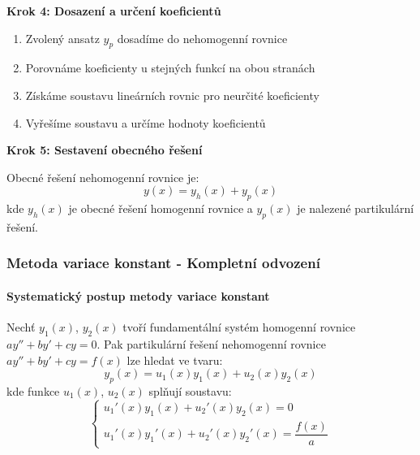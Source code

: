 \vspace{1\baselineskip}

\noindent\textbf{Krok 4: Dosazení a určení koeficientů}

\begin{enumerate}
\item Zvolený ansatz $y_p$ dosadíme do nehomogenní rovnice
\item Porovnáme koeficienty u stejných funkcí na obou stranách
\item Získáme soustavu lineárních rovnic pro neurčité koeficienty
\item Vyřešíme soustavu a určíme hodnoty koeficientů
\end{enumerate}

\vspace{1\baselineskip}

\noindent\textbf{Krok 5: Sestavení obecného řešení}

Obecné řešení nehomogenní rovnice je:
\[
y(x) = y_h(x) + y_p(x)
\]
kde $y_h(x)$ je obecné řešení homogenní rovnice a $y_p(x)$ je nalezené partikulární řešení.

\subsubsection{Metoda variace konstant - Kompletní odvození}
\label{subsubsec:metoda-variance-konstant}

\paragraph{Systematický postup metody variace konstant}

\begin{theorem}
Nechť $y_1(x)$, $y_2(x)$ tvoří fundamentální systém homogenní rovnice $ay'' + by' + cy = 0$. Pak partikulární řešení nehomogenní rovnice $ay'' + by' + cy = f(x)$ lze hledat ve tvaru:
\[
y_p(x) = u_1(x)y_1(x) + u_2(x)y_2(x)
\]
kde funkce $u_1(x)$, $u_2(x)$ splňují soustavu:
\[
\begin{cases}
u_1'(x)y_1(x) + u_2'(x)y_2(x) = 0 \\
u_1'(x)y_1'(x) + u_2'(x)y_2'(x) = \dfrac{f(x)}{a}
\end{cases}
\]
\end{theorem}

